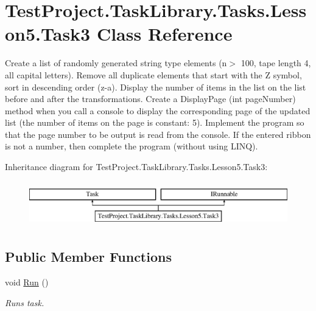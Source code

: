 \hypertarget{class_test_project_1_1_task_library_1_1_tasks_1_1_lesson5_1_1_task3}{}\section{Test\+Project.\+Task\+Library.\+Tasks.\+Lesson5.\+Task3 Class Reference}
\label{class_test_project_1_1_task_library_1_1_tasks_1_1_lesson5_1_1_task3}


Create a list of randomly generated string type elements (n$>$ 100, tape length 4, all capital letters). Remove all duplicate elements that start with the \textquotesingle{}Z\textquotesingle{} symbol, sort in descending order (z-\/a). Display the number of items in the list on the list before and after the transformations. Create a Display\+Page (int page\+Number) method when you call a console to display the corresponding page of the updated list (the number of items on the page is constant\+: 5). Implement the program so that the page number to be output is read from the console. If the entered ribbon is not a number, then complete the program (without using L\+I\+NQ).  


Inheritance diagram for Test\+Project.\+Task\+Library.\+Tasks.\+Lesson5.\+Task3\+:\begin{figure}[H]
\begin{center}
\leavevmode
\includegraphics[height=2.000000cm]{class_test_project_1_1_task_library_1_1_tasks_1_1_lesson5_1_1_task3}
\end{center}
\end{figure}
\subsection*{Public Member Functions}
\begin{DoxyCompactItemize}
\item 
void \mbox{\hyperlink{class_test_project_1_1_task_library_1_1_tasks_1_1_lesson5_1_1_task3_a8e5d629307dea4dd19406e51b204e7d6}{Run}} ()
\begin{DoxyCompactList}\small\item\em Runs task. \end{DoxyCompactList}\end{DoxyCompactItemize}


